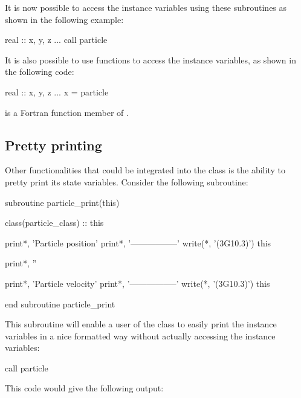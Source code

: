 It is now possible to access the instance variables using these subroutines as shown in the following example:

\begin{fortrancodeenv}
real :: x, y, z
...
call particle %
\end{fortrancodeenv}

It is also possible to use functions to access the instance variables, as shown in the following code:

\begin{fortrancodeenv}
real :: x, y, z
...
x = particle %
\end{fortrancodeenv}

 is a Fortran function member of .

\subsection{Pretty printing}

Other functionalities that could be integrated into the class is the ability to pretty print its state variables. Consider the following subroutine:

\begin{fortrancodeenv}
subroutine particle_print(this)

    class(particle_class) :: this

    print*, 'Particle position'
    print*, '-----------------'
    write(*, '(3G10.3)') this %

    print*, ''

    print*, 'Particle velocity'
    print*, '-----------------'
    write(*, '(3G10.3)') this %

end subroutine particle_print
\end{fortrancodeenv}

This subroutine will enable a user of the class to easily print the instance variables in a nice formatted way without actually accessing the instance variables:

\begin{fortrancodeenv}
call particle %
\end{fortrancodeenv}

This code would give the following output:

